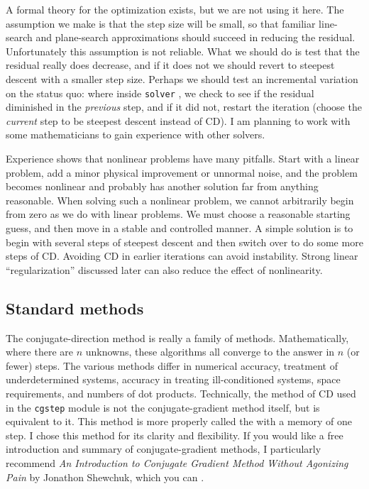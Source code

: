 \par
A formal theory for the optimization exists,
but we are not using it here.
The assumption we make is that the step size will be small,
so that familiar line-search and plane-search approximations
should succeed in reducing the residual.
Unfortunately this assumption is not reliable.
What we should do is test that the residual really does decrease,
and if it does not we should revert
to steepest descent with a smaller step size.
Perhaps we should test an incremental variation on the status quo:
where inside \texttt{solver} ,
we check to see if the residual
diminished in the {\it previous} step, and if it did not,
restart the iteration (choose the {\it current} step to be steepest descent instead of CD).
I am planning to work with some mathematicians
to gain experience with other solvers.

\par
Experience shows that nonlinear problems have many pitfalls.
Start with a linear problem,
add a minor physical improvement or unnormal noise,
and the problem becomes nonlinear and probably has another solution
far from anything reasonable.
When solving such a nonlinear problem,
we cannot arbitrarily begin from zero as we do with linear problems.
We must choose a reasonable starting guess,
and then move in a stable and controlled manner.
A simple solution is to begin with several steps of steepest descent
and then switch over to do some more steps of CD.
Avoiding CD in earlier iterations can avoid instability.
Strong linear ``regularization'' discussed later
can also reduce the effect of nonlinearity.

\subsection{Standard methods}
The conjugate-direction method is really a family of methods.
Mathematically, where there are $n$ unknowns, these algorithms all
converge to the answer in $n$ (or fewer) steps.  The various methods
differ in numerical accuracy, treatment of underdetermined systems,
accuracy in treating ill-conditioned systems, space requirements, and
numbers of dot products.  Technically, the method of CD used in the
\texttt{cgstep} module  is not the
conjugate-gradient method itself, but is equivalent to it.  This
method is more properly called the 
with a memory of one step.  I chose this method for its clarity and
flexibility.  If you would like a free introduction and summary of
conjugate-gradient methods, I particularly recommend {\it An
  Introduction to Conjugate Gradient Method Without Agonizing Pain }
by Jonathon Shewchuk, which you can .

